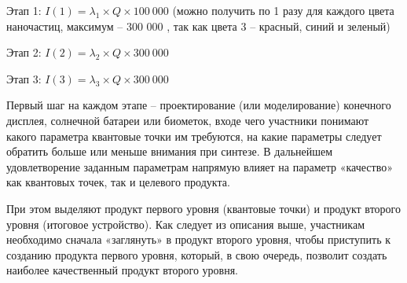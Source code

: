 Этап 1: $I (1)= \lambda_1\times Q\times 100 \: 000$ \textpeso (можно получить по 1 разу для каждого цвета наночастиц, максимум – 300 000 \textpeso, так как цвета 3 – красный, синий и зеленый)

Этап 2: $I (2)= \lambda_2\times Q\times 300 \: 000$ \textpeso

Этап 3: $I (3)= \lambda_3\times Q\times 300 \: 000$ \textpeso

Первый шаг на каждом этапе – проектирование (или моделирование) конечного дисплея, солнечной батареи или биометок, входе чего участники понимают какого параметра квантовые точки им требуются, на какие параметры следует обратить больше или меньше внимания при синтезе. В дальнейшем удовлетворение заданным параметрам напрямую влияет на параметр «качество» как квантовых точек, так и целевого продукта.

При этом выделяют продукт первого уровня (квантовые точки) и продукт второго уровня (итоговое устройство). Как следует из описания выше, участникам необходимо сначала «заглянуть» в продукт второго уровня, чтобы приступить к созданию продукта первого уровня, который, в свою очередь, позволит создать наиболее качественный продукт второго уровня.

